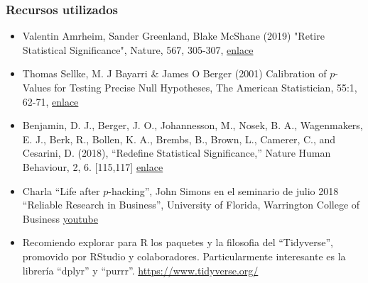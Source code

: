 \documentclass[9pt]{beamer}
\begin{document}
\begin{frame}
  \frametitle{Recursos utilizados}
  \begin{itemize}

\item Valentin Amrheim, Sander Greenland, Blake McShane (2019) "Retire
  Statistical Significance", Nature, 567, 305-307, \href{https://www.nature.com/articles/d41586-019-00857-9}{enlace}

  
\item Thomas Sellke, M. J Bayarri \& James O Berger (2001) Calibration
  of $p$-Values for Testing Precise Null Hypotheses, The American Statistician, 55:1, 62-71, \href{https://doi.org/10.1198/000313001300339950}{enlace}

  
\item Benjamin, D. J., Berger, J. O., Johannesson, M., Nosek, B. A.,
  Wagenmakers, E. J., Berk, R., Bollen, K. A., Brembs, B., Brown, L.,
  Camerer, C., and Cesarini, D. (2018), “Redefine Statistical
  Significance,” Nature Human Behaviour, 2, 6. [115,117]
  \href{https://www.nature.com/articles/s41562-017-0189-z}{enlace}

\item Charla ``Life after $p$-hacking'', John Simons en el seminario de julio 2018 ``Reliable Research in
  Business'', University of Florida, Warrington College of Business
  \href{https://youtu.be/8wDwcp1EwNM}{youtube} 
\item Recomiendo explorar para R los paquetes y la filosofia del
  ``Tidyverse'', promovido por RStudio y
  colaboradores. Particularmente interesante es la librería ``dplyr''
  y ``purrr''. \href{https://www.tidyverse.org/}{https://www.tidyverse.org/}
\end{itemize}
\end{frame}
\end{document}
